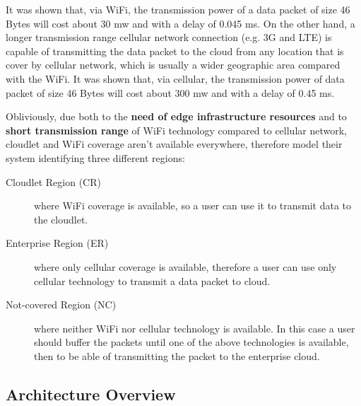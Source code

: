 \documentclass[sigchi]{acmart}
\begin{document}
\vspace{0.3cm}

\begin{quoting}[font=itshape, begintext={``}, endtext={''\cite[par.~3.1]{MSAReport}}]
It was shown that, via WiFi, the transmission power of a data packet of size 46 Bytes will cost about 30 mw and with a delay of 0.045 ms. On the other hand, a longer transmission range cellular network connection (e.g. 3G and LTE) is capable of transmitting the data packet to the cloud from any location that is cover by cellular network, which is usually a wider geographic area compared with the WiFi. It was shown that, via cellular, the transmission power of data packet of size 46 Bytes will cost about 300 mw and with a delay of 0.45 ms.
\end{quoting}

\vspace{0.3cm}

Obliviously, due both to the \textbf{need of edge infrastructure resources} and to \textbf{short transmission range} of WiFi technology compared to cellular network, cloudlet and WiFi coverage aren't available everywhere, therefore \citet{MSAReport} model their system identifying three different regions:\cite[par.~3.1]{MSAReport} 

\begin{description}

\item[Cloudlet Region (CR)] where WiFi coverage is available, so a user can use it to transmit data to the cloudlet.

\item[Enterprise Region (ER)] where only cellular coverage is available, therefore  a user can use only cellular technology to transmit a data packet to cloud. 

\item[Not-covered Region (NC)] where neither WiFi nor cellular technology is available. In this case a user should buffer the packets until one of the above technologies is available, then to be able of transmitting the packet to the enterprise cloud. 

\end{description}

\subsection{Architecture Overview}

\vspace{0.3cm}
\end{document}
